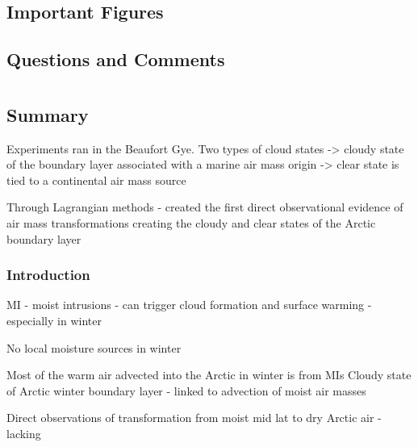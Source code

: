 \documentclass{article}
\begin{document}
\subsection*{Important Figures}
\subsection*{Questions and Comments}
\newpage
\clearpage
\newpage
\clearpage




\def \sect {Ali2020}
\section{\citeauthor{\sect} \citeyear{\sect}}
\textbf{\citefield{\sect}{title}\nocite{\sect}}
\subsection*{Summary}
Experiments ran in the Beaufort Gye. Two types of cloud states -> cloudy state of the boundary layer associated with a marine air mass origin -> clear state is tied to a continental air mass source

Through Lagrangian methods - created the first direct observational evidence of air mass transformations creating the cloudy and clear states of the Arctic boundary layer

\subsubsection*{Introduction}
MI - moist intrusions - can trigger cloud formation and surface warming - especially in winter 

No local moisture sources in winter 

Most of the warm air advected into the Arctic in winter is from MIs
Cloudy state of Arctic winter boundary layer - linked to advection of moist air masses

Direct observations of transformation from moist mid lat to dry Arctic air - lacking
\end{document}
